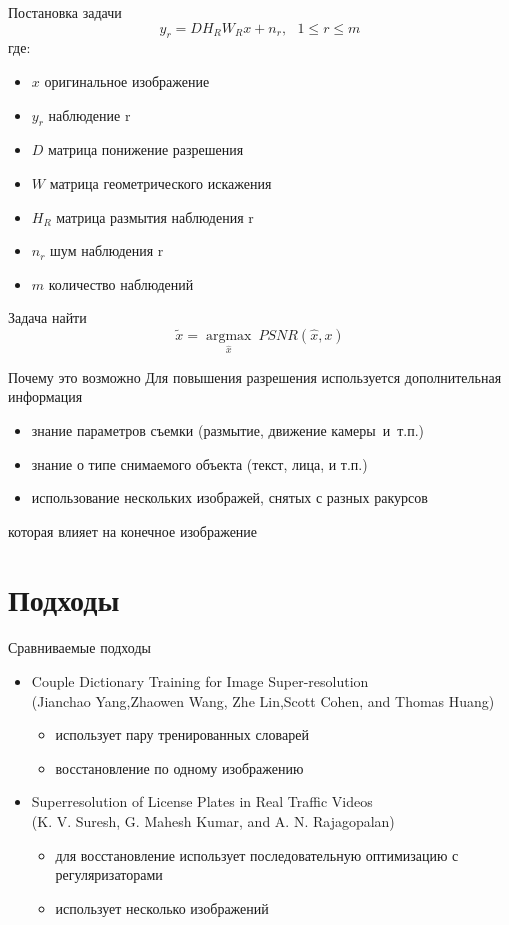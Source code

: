 \begin{frame}{Постановка задачи}
 $$y_r = D H_R W_R x + n_r,~ ~ ~ 1 \leq r \leq m$$
 где:
 \begin{itemize}
   \item $x$ оригинальное изображение
   \item $y_r$ наблюдение r
   \item $D$ матрица понижение разрешения
   \item $W$ матрица геометрического искажения
   \item $H_R$ матрица размытия наблюдения r
   \item $n_r$ шум наблюдения r
   \item $m$ количество наблюдений
 \end{itemize}
 Задача найти
 $$ \tilde{x} = \underset{\hat{x}}{\operatorname{argmax}}~  PSNR(\hat{x},x)$$
\end{frame}

\begin{frame}{Почему это возможно}
  Для повышения разрешения используется дополнительная информация
  \begin{itemize}
    \item знание параметров съемки (размытие, движение камеры~и~т.п.)
    \item знание о типе снимаемого объекта (текст, лица, и т.п.)
    \item использование нескольких изображей, снятых с разных ракурсов
  \end{itemize}
  которая влияет на конечное изображение
\end{frame}

\section{Подходы}
\begin{frame}{Сравниваемые подходы}
  \begin{itemize}
    \item Couple Dictionary Training for Image Super-resolution \\
        (Jianchao Yang,Zhaowen Wang, Zhe Lin,Scott Cohen, and Thomas Huang)
      \begin{itemize}
        \item использует пару тренированных словарей
        \item восстановление по одному изображению
      \end{itemize}
    \item Superresolution of License Plates in Real Traffic Videos \\
      (K. V. Suresh, G. Mahesh Kumar, and A. N. Rajagopalan)
      \begin{itemize}
        \item для восстановление использует последовательную оптимизацию с
          регуляризаторами
        \item использует несколько изображений
      \end{itemize}
  \end{itemize}
\end{frame}

